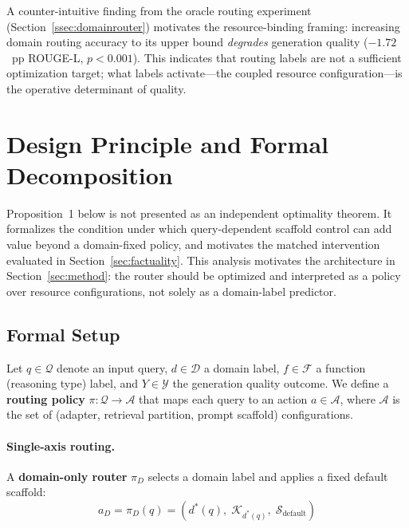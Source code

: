 \documentclass[a4paper,fleql,doubleblind]{cas-sc}
\begin{document}
A counter-intuitive finding from the oracle routing experiment (Section~\ref{ssec:domainrouter}) motivates the resource-binding framing: increasing domain routing accuracy to its upper bound \emph{degrades} generation quality ($-1.72$~pp ROUGE-L, $p{<}0.001$). This indicates that routing labels are not a sufficient optimization target; what labels activate---the coupled resource configuration---is the operative determinant of quality.
\section{Design Principle and Formal Decomposition}
\label{sec:theory}

Proposition~1 below is not presented as an independent optimality theorem.
It formalizes the condition under which query-dependent scaffold control can add value
beyond a domain-fixed policy, and motivates the matched intervention evaluated in
Section~\ref{sec:factuality}.
This analysis motivates the architecture in Section~\ref{sec:method}: the router should
be optimized and interpreted as a policy over resource configurations, not solely as a
domain-label predictor.

\subsection{Formal Setup}
\label{ssec:theory_setup}

Let $q \in \mathcal{Q}$ denote an input query, $d \in \mathcal{D}$ a domain label,
$f \in \mathcal{F}$ a function (reasoning type) label, and
$Y \in \mathcal{Y}$ the generation quality outcome.
We define a \textbf{routing policy} $\pi: \mathcal{Q} \to \mathcal{A}$ that maps each
query to an action $a \in \mathcal{A}$, where $\mathcal{A}$ is the set of
(adapter, retrieval partition, prompt scaffold) configurations.

\paragraph{Single-axis routing.}
A \textbf{domain-only router} $\pi_D$ selects a domain label and applies a
fixed default scaffold:
\begin{equation}
    a_D = \pi_D(q) = (d^*(q),\; \mathcal{K}_{d^*(q)},\; \mathcal{S}_{\text{default}})
    \label{eq:single_axis}
\end{equation}
\end{document}
